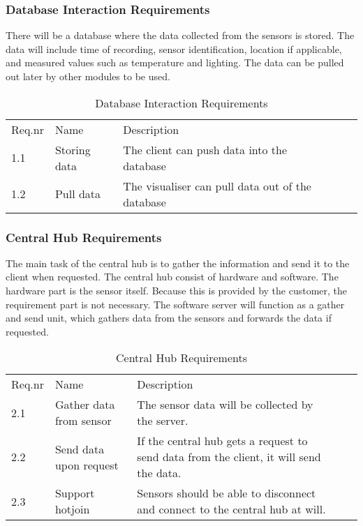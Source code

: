 \documentclass[../document]{subfiles}
\begin{document}
\subsubsection{Database Interaction Requirements}
There will be a database where the data collected from the sensors is stored. The data will include time of recording, sensor identification, location if applicable, and measured values such as temperature and lighting. The data can be pulled out later by other modules to be used. 

\begin{table}[H]
\caption{Database Interaction Requirements}
\centering
\begin{tabularx}{\textwidth}{|l|X|X|l|X|}
\hline
\\ \hline Req.nr
&Name
&Description
\\ \hline 1.1
&Storing data
&The client can push data into the database
\\ \hline 1.2
&Pull data
&The visualiser can pull data out of the database
\\ \hline 
\end{tabularx}
\end{table}

\subsubsection{Central Hub Requirements}
The main task of the central hub is to gather the information and send it to the client when requested. The central hub consist of hardware and software. The hardware part is the sensor itself. Because this is provided by the customer, the requirement part is not necessary. The software server will function as a gather and send unit, which gathers data from the sensors and forwards the data if requested.

\begin{table}[H]
\caption{Central Hub Requirements}
\centering
\begin{tabularx}{\textwidth}{|l|X|X|l|X|}
\hline
\\ \hline Req.nr
&Name
&Description
\\ \hline 2.1
&Gather data from sensor
&The sensor data will be collected by the server.
\\ \hline 2.2
&Send data upon request
&If the central hub gets a request to send data from the client, it will send the data.
\\ \hline 2.3
&Support hotjoin
&Sensors should be able to disconnect and connect to the central hub at will.
\\ \hline 
\end{tabularx}
\end{table}
\end{document}
